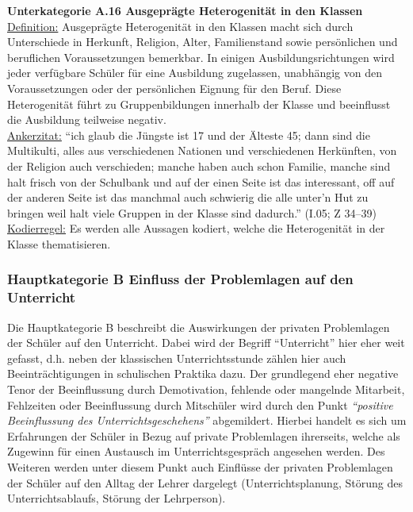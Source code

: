 \noindent
\textbf{Unterkategorie A.16 Ausgeprägte Heterogenität in den Klassen}\\
\underline{Definition:} Ausgeprägte Heterogenität in den Klassen macht sich durch Unterschiede in Herkunft, Religion, Alter, Familienstand sowie persönlichen und beruflichen Voraussetzungen bemerkbar. In einigen Ausbildungsrichtungen wird jeder verfügbare Schüler für eine Ausbildung zugelassen, unabhängig von den Voraussetzungen oder der persönlichen Eignung für den Beruf. Diese Heterogenität führt zu Gruppenbildungen innerhalb der Klasse und beeinflusst die Ausbildung teilweise negativ.\\
\underline{Ankerzitat:} "`ich glaub die Jüngste ist 17 und der Älteste 45; dann sind die Multikulti, alles aus verschiedenen Nationen und verschiedenen Herkünften, von der Religion auch verschieden; manche haben auch schon Familie, manche sind halt frisch von der Schulbank und auf der einen Seite ist das interessant, off auf der anderen Seite ist das manchmal auch schwierig die alle unter'n Hut zu bringen weil halt viele Gruppen in der Klasse sind dadurch."' (I.05; Z 34--39)\\
\underline{Kodierregel:} Es werden alle Aussagen kodiert, welche die Heterogenität in der Klasse thematisieren.

\subsubsection{Hauptkategorie B Einfluss der Problemlagen auf den Unterricht}
\label{sec:HauptkategorieBEinflussDerProblemlagenAufDenUnterricht}

Die Hauptkategorie B beschreibt die Auswirkungen der privaten Problemlagen der Schüler auf den Unterricht. Dabei wird der Begriff "`Unterricht"' hier eher weit gefasst, d.h. neben der klassischen Unterrichtsstunde zählen hier auch Beeinträchtigungen in schulischen Praktika dazu. Der grundlegend eher negative Tenor der Beeinflussung durch Demotivation, fehlende oder mangelnde Mitarbeit, Fehlzeiten oder Beeinflussung durch Mitschüler wird durch den Punkt \textit{"`positive Beeinflussung des Unterrichtsgeschehens"'} abgemildert. Hierbei handelt es sich um Erfahrungen der Schüler in Bezug auf private Problemlagen ihrerseits, welche als Zugewinn für einen Austausch im Unterrichtsgespräch angesehen werden. Des Weiteren werden unter diesem Punkt auch Einflüsse der privaten Problemlagen der Schüler auf den Alltag der Lehrer dargelegt (Unterrichtsplanung, Störung des Unterrichtsablaufs, Störung der Lehrperson).\\

